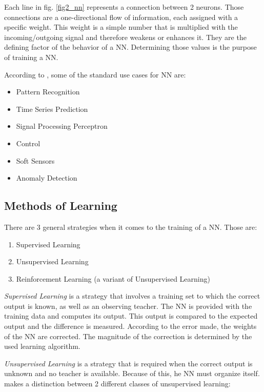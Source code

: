 Each line in fig. \ref{fig2_nn} represents a connection between 2 neurons. Those connections are a one-directional flow of information, each assigned with a specific weight. This weight is a simple number that is multiplied with the incoming/outgoing signal and therefore weakens or enhances it. They are the defining factor of the behavior of a NN. Determining those values is the purpose of training a NN\cite{Bourg04}.

According to \cite{Shiffman12}, some of the standard use cases for NN are:

\begin{itemize}
	\item Pattern Recognition
	\item Time Series Prediction
	\item Signal Processing Perceptron
	\item Control
	\item Soft Sensors
	\item Anomaly Detection
\end{itemize}


\subsection{Methods of Learning}
There are 3 general strategies when it comes to the training of a NN\cite{Bourg04}. Those are:

\begin{enumerate}
	\item Supervised Learning
	\item Unsupervised Learning
	\item Reinforcement Learning (a variant of Unsupervised Learning\cite{Rojas96})
\end{enumerate}

\emph{Supervised Learning} is a strategy that involves a training set to which the correct output is known, as well as an observing teacher. The NN is provided with the training data and computes its output. This output is compared to the expected output and the difference is measured. According to the error made, the weights of the NN are corrected. The magnitude of the correction is determined by the used learning algorithm\cite{Rojas96}.

\emph{Unsupervised Learning} is a strategy that is required when the correct output is unknown and no teacher is available. Because of this, he NN must organize itself\cite{Shiffman12}. \cite{Rojas96} makes a distinction between 2 different classes of unsupervised learning:

